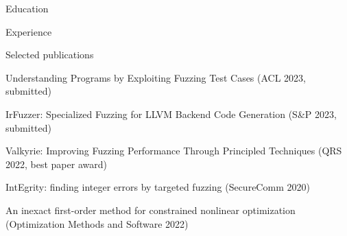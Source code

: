 %
%
%
%
\def\lang{eng}





\begin{rSection}{Education}
	
	
\end{rSection}

\begin{rSection}{Experience}
	
	
	
\end{rSection}

\begin{rSection}{Selected publications}
	\begin{rSubsection}{}{}{}{}
		\item Understanding Programs by Exploiting Fuzzing Test Cases (ACL 2023, submitted)
		\item IrFuzzer: Specialized Fuzzing for LLVM Backend Code Generation (S\&P 2023, submitted)
		\item Valkyrie: Improving Fuzzing Performance Through Principled Techniques (QRS 2022, best paper award)
		\item IntEgrity: finding integer errors by targeted fuzzing (SecureComm 2020)
		\item An inexact first-order method for constrained nonlinear optimization (Optimization Methods and Software 2022)
	\end{rSubsection}
\end{rSection}

